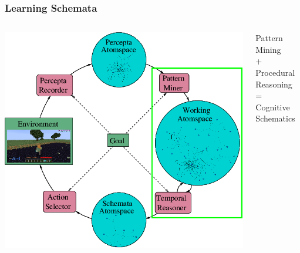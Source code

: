 \documentclass[aspectratio=169]{beamer}
\begin{document}
\begin{frame}
  \frametitle{Learning Schemata}


  \begin{columns}
    \column{3.2in}
    \includegraphics[scale=0.3]{pictures/rocca-chart-learning-highlight-v0.7.png}
    \column{2.5in}
    \begin{center}
      Pattern Mining\\
      +\\
      Procedural Reasoning\\
      =\\
      Cognitive Schematics
    \end{center}
  \end{columns}


\end{frame}
\end{document}
